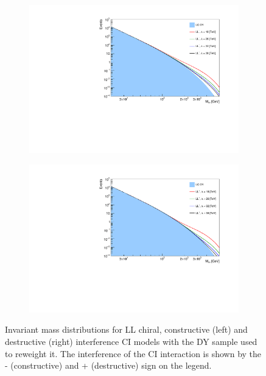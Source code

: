 \begin{figure}[]
    \centering
    \begin{subfigure}[b]{0.49\textwidth}
        \centering
        \includegraphics[width=\textwidth]{figures/analysis/datamc/sigmodel/constSigsOverlay.pdf}
        \label{fig:datamc:sigconstoverlays}
    \end{subfigure}
    \begin{subfigure}[b]{0.49\textwidth}
        \centering
        \includegraphics[width=\textwidth]{figures/analysis/datamc/sigmodel/destSigsOverlay.pdf}
        \label{fig:datamc:sigdestoverlays}
    \end{subfigure}
    \caption[Invariant mass distribution for reweighted CI LL chiral signal models]{Invariant mass distributions for LL chiral, constructive (left) and destructive (right) interference CI models with the DY sample used to reweight it. The interference of the CI interaction is shown by the - (constructive) and + (destructive) sign on the legend.}
    \label{fig:datamc:sigoverlays}
\end{figure}

